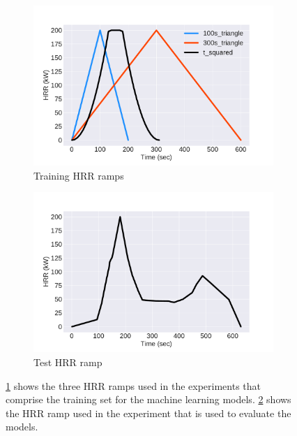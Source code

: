 \documentclass{article}
\begin{document}
\begin{figure}[htbp]
  \centering
  \begin{subfigure}[t]{.45\textwidth}
      \centering
      \includegraphics[width=\textwidth,keepaspectratio]{figures/training_ramps.pdf}
      \caption{Training HRR ramps}
      \label{fig:training_ramps}
  \end{subfigure}
  \begin{subfigure}[t]{.45\textwidth}
      \centering
      \includegraphics[width=\textwidth ,keepaspectratio]{figures/test_ramp.pdf}
      \caption{Test HRR ramp}
      \label{fig:test_ramp}
  \end{subfigure}
  \caption{\protect\ref{fig:training_ramps} shows the three HRR ramps used in the experiments that comprise the training set for the machine learning models. \protect\ref{fig:test_ramp} shows the HRR ramp used in the experiment that is used to evaluate the models.}
  \label{fig:hrr_ramps}
\end{figure}
\end{document}
